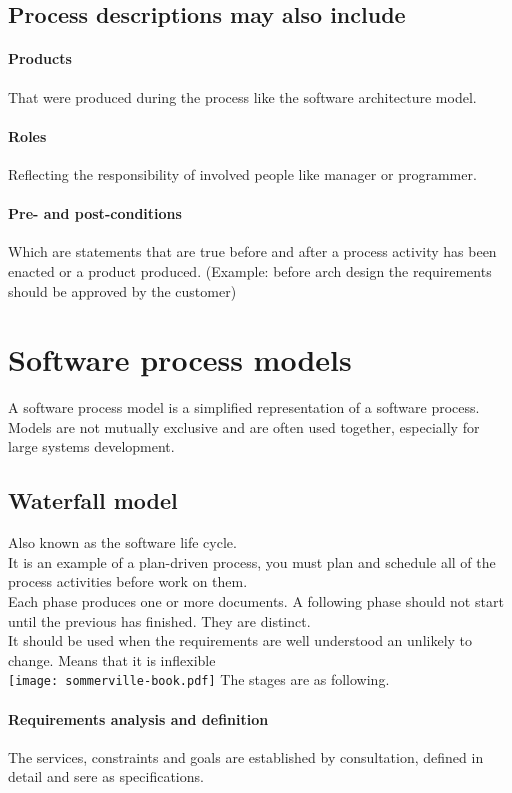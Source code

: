 \documentclass[a4paper,11pt,twocolumn]{report}
\begin{document}
    \subsection{Process descriptions may also include}
    \paragraph{Products}
    That were produced during the process like the software architecture model.
    \paragraph{Roles}
    Reflecting the responsibility of involved people like manager or
    programmer.
    \paragraph{Pre- and post-conditions}
    Which are statements that are true before and after a process activity has
    been enacted or a product produced. (Example: before arch design the
    requirements should be approved by the customer)
    \section{Software process models}
    A software process model is a simplified representation of a software
    process.\\
    Models are not mutually exclusive and are often used together, especially
    for large systems development.
    \subsection{Waterfall model}
    Also known as the software life cycle. \\
    It is an example of a plan-driven process, you must plan and schedule all
    of the process activities before work on them.\\
    Each phase produces one or more documents. A following phase should not
    start until the previous has finished. They are distinct.\\
    It should be used when the requirements are well understood an unlikely to
    change. Means that it is inflexible\\
    \texttt{[image: sommerville-book.pdf]}
    The stages are as following.
    \paragraph{Requirements analysis and definition}
    The services, constraints and goals are established by consultation,
    defined in detail and sere as specifications.
\end{document}
